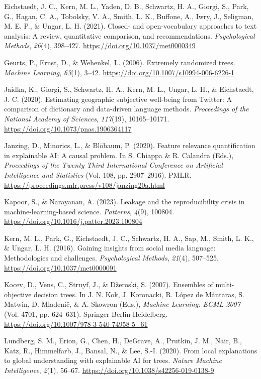 \documentclass[11pt,letterpaper]{article}
\newcommand{\APAref}{\par\noindent\hangindent=0.5in\hangafter=1\relax}
\begin{document}
\APAref Eichstaedt, J. C., Kern, M. L., Yaden, D. B., Schwartz, H. A., Giorgi, S., Park, G., Hagan, C. A., Tobolsky, V. A., Smith, L. K., Buffone, A., Iwry, J., Seligman, M. E. P., \& Ungar, L. H. (2021). Closed- and open-vocabulary approaches to text analysis: A review, quantitative comparison, and recommendations. \emph{Psychological Methods}, \emph{26}(4), 398--427. \url{https://doi.org/10.1037/met0000349}

\APAref Geurts, P., Ernst, D., \& Wehenkel, L. (2006). Extremely randomized trees. \emph{Machine Learning}, \emph{63}(1), 3--42. \url{https://doi.org/10.1007/s10994-006-6226-1}

\APAref Jaidka, K., Giorgi, S., Schwartz, H. A., Kern, M. L., Ungar, L. H., \& Eichstaedt, J. C. (2020). Estimating geographic subjective well-being from Twitter: A comparison of dictionary and data-driven language methods. \emph{Proceedings of the National Academy of Sciences}, \emph{117}(19), 10165--10171. \url{https://doi.org/10.1073/pnas.1906364117}

\APAref Janzing, D., Minorics, L., \& Blöbaum, P. (2020). Feature relevance quantification in explainable AI: A causal problem. In S. Chiappa \& R. Calandra (Eds.), \emph{Proceedings of the Twenty Third International Conference on Artificial Intelligence and Statistics} (Vol. 108, pp. 2907--2916). PMLR. \url{https://proceedings.mlr.press/v108/janzing20a.html}

\APAref Kapoor, S., \& Narayanan, A. (2023). Leakage and the reproducibility crisis in machine-learning-based science. \emph{Patterns}, \emph{4}(9), 100804. \url{https://doi.org/10.1016/j.patter.2023.100804}

\APAref Kern, M. L., Park, G., Eichstaedt, J. C., Schwartz, H. A., Sap, M., Smith, L. K., \& Ungar, L. H. (2016). Gaining insights from social media language: Methodologies and challenges. \emph{Psychological Methods}, \emph{21}(4), 507--525. \url{https://doi.org/10.1037/met0000091}

\APAref Kocev, D., Vens, C., Struyf, J., \& Džeroski, S. (2007). Ensembles of multi-objective decision trees. In J. N. Kok, J. Koronacki, R. López de Mántaras, S. Matwin, D. Mladenič, \& A. Skowron (Eds.), \emph{Machine Learning: ECML 2007} (Vol. 4701, pp. 624--631). Springer Berlin Heidelberg. \url{https://doi.org/10.1007/978-3-540-74958-5_61}

\APAref Lundberg, S. M., Erion, G., Chen, H., DeGrave, A., Prutkin, J. M., Nair, B., Katz, R., Himmelfarb, J., Bansal, N., \& Lee, S.-I. (2020). From local explanations to global understanding with explainable AI for trees. \emph{Nature Machine Intelligence}, \emph{2}(1), 56--67. \url{https://doi.org/10.1038/s42256-019-0138-9}
\end{document}
